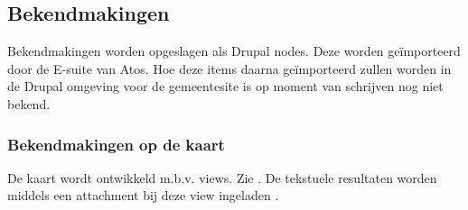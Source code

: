 \subsection{Bekendmakingen}\label{bekendmakingen}

Bekendmakingen worden opgeslagen als Drupal nodes. Deze worden ge\"{i}mporteerd door de E-suite van Atos. Hoe deze items daarna ge\"{i}mporteerd zullen worden in de Drupal omgeving voor de gemeentesite is op moment van schrijven nog niet bekend.

\subsubsection{Bekendmakingen op de kaart}\label{bekendmakingen-op-de-kaart}

De kaart wordt ontwikkeld m.b.v. views. Zie . De tekstuele resultaten worden middels een attachment bij deze view ingeladen .